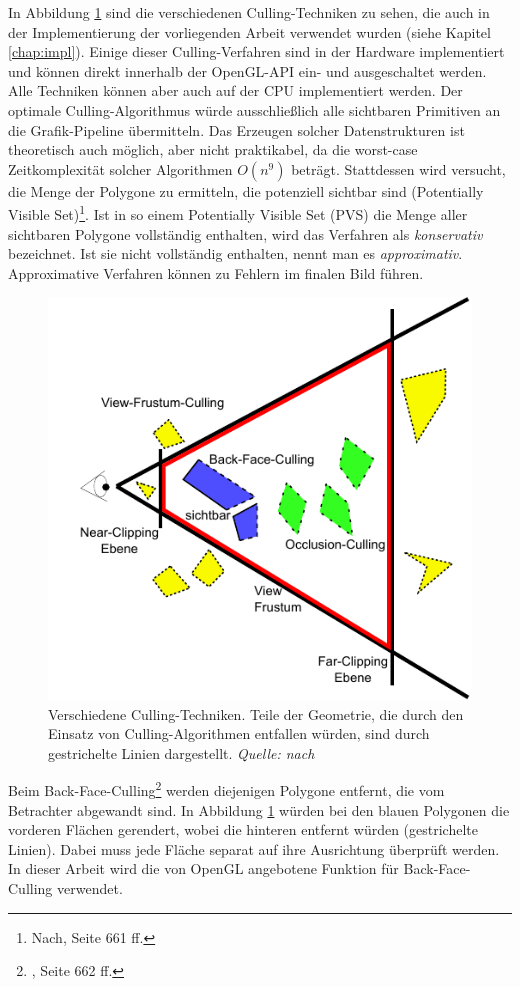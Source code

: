 In Abbildung \ref{fig:basics:culling} sind die verschiedenen Culling-Techniken zu sehen, die auch in der Implementierung der vorliegenden Arbeit verwendet wurden (siehe Kapitel \ref{chap:impl}).
Einige dieser Culling-Verfahren sind in der Hardware implementiert und können direkt innerhalb der OpenGL-API ein- und ausgeschaltet werden. Alle Techniken können aber auch auf der CPU implementiert werden. Der optimale Culling-Algorithmus würde ausschließlich alle sichtbaren Primitiven an die Grafik-Pipeline übermitteln. Das Erzeugen solcher Datenstrukturen ist theoretisch auch möglich, aber nicht praktikabel, da die worst-case Zeitkomplexität solcher Algorithmen $O(n^{9})$ beträgt. Stattdessen wird versucht, die Menge der Polygone zu ermitteln, die potenziell sichtbar sind (Potentially Visible Set)\footnote{Nach, Seite 661 ff.}. Ist in so einem Potentially Visible Set (PVS) die Menge aller sichtbaren Polygone vollständig enthalten, wird das Verfahren als \textit{konservativ} bezeichnet. Ist sie nicht vollständig enthalten, nennt man es \textit{approximativ}. Approximative Verfahren können zu Fehlern im finalen Bild führen.

\begin{figure}
  \centering
  \includegraphics[scale=0.8]{images/culling.pdf}
  \caption{Verschiedene Culling-Techniken. Teile der Geometrie, die durch den Einsatz von Culling-Algorithmen entfallen würden, sind durch gestrichelte Linien dargestellt. \textit{Quelle: nach} }
  \label{fig:basics:culling}
\end{figure}
Beim Back-Face-Culling\footnote{\cite{RTR3}, Seite 662 ff.} werden diejenigen Polygone entfernt, die vom Betrachter abgewandt sind. In Abbildung \ref{fig:basics:culling} würden bei den blauen Polygonen die vorderen Flächen gerendert, wobei die hinteren entfernt würden (gestrichelte Linien). Dabei muss jede Fläche separat auf ihre Ausrichtung überprüft werden. In dieser Arbeit wird die von OpenGL angebotene Funktion für Back-Face-Culling verwendet.


